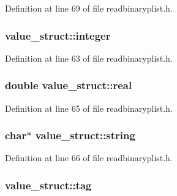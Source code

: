 Definition at line 69 of file readbinaryplist.\+h.

\subsubsection[{\texorpdfstring{integer}{integer}}]{ value\+\_\+struct\+::integer}\hypertarget{structvalue__struct_a49270e9fed428e9ce09ac6188cb160eb}{}\label{structvalue__struct_a49270e9fed428e9ce09ac6188cb160eb}


Definition at line 63 of file readbinaryplist.\+h.

\subsubsection[{\texorpdfstring{real}{real}}]{\setlength{\rightskip}{0pt plus 5cm}double value\+\_\+struct\+::real}\hypertarget{structvalue__struct_a4ab3629455d6faa852c3d935416b73b8}{}\label{structvalue__struct_a4ab3629455d6faa852c3d935416b73b8}


Definition at line 65 of file readbinaryplist.\+h.

\subsubsection[{\texorpdfstring{string}{string}}]{\setlength{\rightskip}{0pt plus 5cm}char$\ast$ value\+\_\+struct\+::string}\hypertarget{structvalue__struct_a743dfc556105c981212ba3df29568370}{}\label{structvalue__struct_a743dfc556105c981212ba3df29568370}


Definition at line 66 of file readbinaryplist.\+h.

\subsubsection[{\texorpdfstring{tag}{tag}}]{ value\+\_\+struct\+::tag}\hypertarget{structvalue__struct_a451c0c45be11ca6802b0d4c6af95f321}{}\label{structvalue__struct_a451c0c45be11ca6802b0d4c6af95f321}



